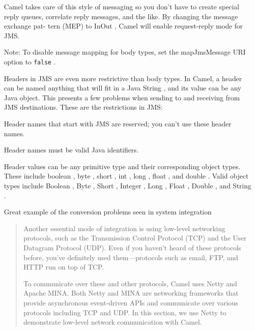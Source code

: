 \documentclass[Screen16to9,17pt]{foils}
\begin{document}

Camel takes care of this style of messaging so you don’t have to create special reply
queues, correlate reply messages, and the like. By changing the message exchange pat-
tern (MEP) to InOut , Camel will enable request-­reply mode for JMS.





Note: To disable message mapping for body types, set the mapJmsMessage URI option to
\verb+false+ .



Headers in JMS are even more restrictive than body types. In Camel, a header can be
named anything that will fit in a Java String , and its value can be any Java object. This
presents a few problems when sending to and receiving from JMS destinations.
These are the restrictions in JMS:
\begin{list2}
\item Header names that start with JMS are reserved; you can’t use these header names.
\item Header names must be valid Java identifiers.
\item Header values can be any primitive type and their corresponding object
types. These include boolean , byte , short , int , long , float , and double .
Valid object types include Boolean , Byte , Short , Integer , Long , Float , Double ,
and String .
\end{list2}

\vskip 2cm
\centerline{Great example of the conversion problems seen in system integration}


\begin{quote}
  Another essential mode of integration is using
low-­level networking protocols, such as the Transmission Control Protocol (TCP)
and the User Datagram Protocol (UDP). Even if you haven’t heard of these protocols
before, you’ve definitely used them—protocols such as email, FTP, and HTTP run on
top of TCP.

To communicate over these and other protocols, Camel uses Netty and Apache
MINA. Both Netty and MINA are networking frameworks that provide asynchronous
event-­driven APIs and communicate over various protocols including TCP and UDP.
In this section, we use Netty to demonstrate low-­level network communication with
Camel.
\end{quote}
\end{document}
